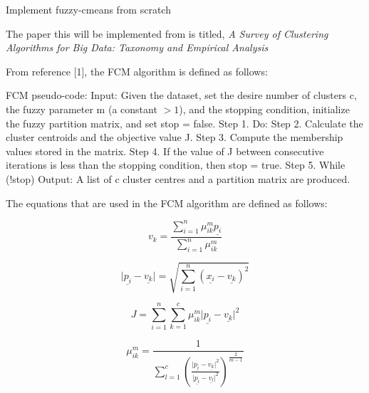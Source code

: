 Implement fuzzy-cmeans from scratch

The paper this will be implemented from is titled, \textit{A Survey of Clustering Algorithms for Big Data: Taxonomy and Empirical Analysis}


From reference [1], the FCM algorithm is defined as follows: \newline

\begin{tcolorbox}
FCM pseudo-code:  \newline
Input: Given the dataset, set the desire number of clusters c, the fuzzy parameter m (a constant $> 1$), and the stopping condition, initialize the fuzzy partition matrix, and set stop = false.  \newline
Step 1. Do:  \newline
Step 2. Calculate the cluster centroids and the objective value J.\newline
Step 3. Compute the membership values stored in the matrix.  \newline
Step 4. If the value of J between consecutive iterations is less than the stopping condition, then stop = true.  \newline
Step 5. While (!stop)  \newline
Output: A list of c cluster centres and a partition matrix are produced.   
\end{tcolorbox}  

The equations that are used in the FCM algorithm are defined as follows: \newline

\begin{equation}
\label{eq:vk}
v_{k}=\frac{\sum_{i=1}^n{{\mu^{m}_{{i}{k}}{{\underline{p_{i}}}}}}}{\sum_{i=1}^n{{\mu^{m}_{{i}{k}}}}}
\end{equation}
   
\begin{equation}
\label{eq:distance}     
{\vert{\underline{p_{i}}}-{\underline{v_{k}}}\vert}=\sqrt{\sum_{i=1}^{n}{({\underline{x_{i}}}-{\underline{v_{k}}})^2}}
\end{equation}
  
\begin{equation}
\label{eq:objective_function}
J=\sum_{i=1}^{n}{\sum_{k=1}^{c}{\mu^{m}_{{i}{k}}{\vert{\underline{p_{i}}}-{\underline{v_{k}}}\vert^{2}}}}
\end{equation}  

\begin{equation}
\label{eq:membership_value}
{\mu^{m}_{{i}{k}}}=\frac{1}{\sum_{l=1}^{c}{(\frac{{\vert{\underline{p_{i}}}-{\underline{v_{k}}}\vert^{2}}}{{\vert{\underline{p_{i}}}-{\underline{v_{l}}}\vert^{2}}})}^{\frac{2}{m-1}}}
\end{equation}

